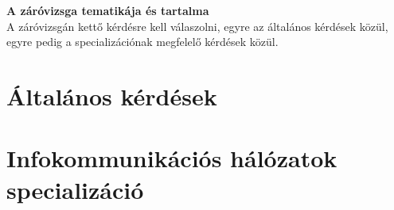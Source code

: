 \def\PAPER{a4paper} %
\def\FONTSIZE{10pt} %
\def\OPTIONS{twoside} %
\def\TARSSZERZO{} %



\setlength{\parskip}{6pt plus 3pt minus 3pt} %
\setcounter{tocdepth}{3} %


\maketitle
%
\textbf{ A záróvizsga tematikája és tartalma}\\
A záróvizsgán kettő kérdésre kell válaszolni, egyre az általános kérdések közül, egyre pedig a specializációnak megfelelő kérdések közül.
\tableofcontents
\cleardoublepage
\part{Általános kérdések}
	


\part[Infokommunikációs hálózatok]{Infokommunikációs hálózatok specializáció}







%
%
%
%
%
%

%
%
%
%
%
%

\printindex{}
